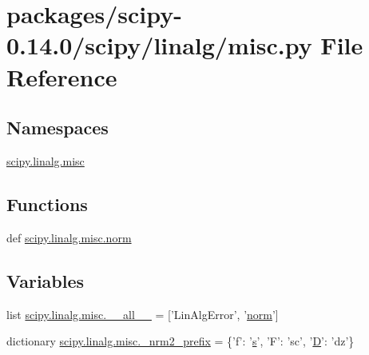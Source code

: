 \hypertarget{scipy-0_814_80_2scipy_2linalg_2misc_8py}{}\section{packages/scipy-\/0.14.0/scipy/linalg/misc.py File Reference}
\label{scipy-0_814_80_2scipy_2linalg_2misc_8py}
\subsection*{Namespaces}
\begin{DoxyCompactItemize}
\item 
 \hyperlink{namespacescipy_1_1linalg_1_1misc}{scipy.\+linalg.\+misc}
\end{DoxyCompactItemize}
\subsection*{Functions}
\begin{DoxyCompactItemize}
\item 
def \hyperlink{namespacescipy_1_1linalg_1_1misc_a72d14d84fe57ff46eed95e01eba04c72}{scipy.\+linalg.\+misc.\+norm}
\end{DoxyCompactItemize}
\subsection*{Variables}
\begin{DoxyCompactItemize}
\item 
list \hyperlink{namespacescipy_1_1linalg_1_1misc_a71866d9c3fe8f2d50e79819bde1da3fe}{scipy.\+linalg.\+misc.\+\_\+\+\_\+all\+\_\+\+\_\+} = \mbox{[}'Lin\+Alg\+Error', '\hyperlink{vecnorm_8cc_a57c51d3f8cc26dd32ade0c9cd6b4997e}{norm}'\mbox{]}
\item 
dictionary \hyperlink{namespacescipy_1_1linalg_1_1misc_aec5db2f7ab880edacfa07edc1a9d0075}{scipy.\+linalg.\+misc.\+\_\+nrm2\+\_\+prefix} = \{'f'\+: '\hyperlink{indexexpr_8h_ae024b0db549122b44c349ae28ec990dc}{s}', 'F'\+: 'sc', '\hyperlink{odrpack_8h_a7dae6ea403d00f3687f24a874e67d139}{D}'\+: 'dz'\}
\end{DoxyCompactItemize}
